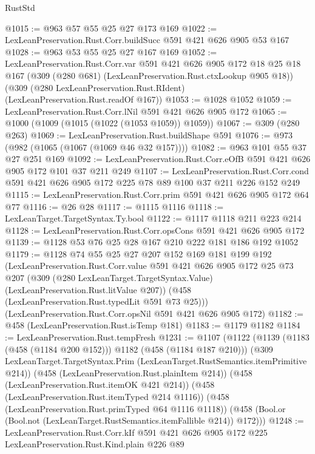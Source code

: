 \begin{lexlean}{RustStd}
\begin{coremodule}
@1015 := @963 @57 @55 @25 @27 @173 @169
@1022 := LexLeanPreservation.Rust.Corr.buildSucc @591 @421 @626 @905 @53 @167
@1028 := @963 @53 @55 @25 @27 @167 @169
@1052 := LexLeanPreservation.Rust.Corr.var
    @591
    @421
    @626
    @905
    @172
    @18
    @25
    @18
    @167
    (@309 (@280 @681) (LexLeanPreservation.Rust.ctxLookup @905 @18))
    (@309 (@280 LexLeanPreservation.Rust.RIdent) (LexLeanPreservation.Rust.readOf @167))
@1053 := @1028 @1052
@1059 := LexLeanPreservation.Rust.Corr.lNil @591 @421 @626 @905 @172
@1065 := @1000 (@1009 (@1015 (@1022 (@1053 @1059)) @1059))
@1067 := @309 (@280 @263)
@1069 := LexLeanPreservation.Rust.buildShape @591
@1076 := @973 (@982 (@1065 (@1067 (@1069 @46 @32 @157))))
@1082 := @963 @101 @55 @37 @27 @251 @169
@1092 := LexLeanPreservation.Rust.Corr.eOfB @591 @421 @626 @905 @172 @101 @37 @211 @249
@1107 := LexLeanPreservation.Rust.Corr.cond
    @591
    @421
    @626
    @905
    @172
    @225
    @78
    @89
    @100
    @37
    @211
    @226
    @152
    @249
@1115 := LexLeanPreservation.Rust.Corr.prim @591 @421 @626 @905 @172 @64 @77
@1116 := @26 @28
@1117 := @1115 @1116
@1118 := LexLeanTarget.TargetSyntax.Ty.bool
@1122 := @1117 @1118 @211 @223 @214
@1128 := LexLeanPreservation.Rust.Corr.opsCons @591 @421 @626 @905 @172
@1139 := @1128 @53 @76 @25 @28 @167 @210 @222 @181 @186 @192 @1052
@1179 := @1128
    @74
    @55
    @25
    @27
    @207
    @152
    @169
    @181
    @199
    @192
    (LexLeanPreservation.Rust.Corr.value
      @591
      @421
      @626
      @905
      @172
      @25
      @73
      @207
      (@309 (@280 LexLeanTarget.TargetSyntax.Value) (LexLeanPreservation.Rust.litValue @207))
      (@458 (LexLeanPreservation.Rust.typedLit @591 @73 @25)))
    (LexLeanPreservation.Rust.Corr.opsNil @591 @421 @626 @905 @172)
@1182 := @458 (LexLeanPreservation.Rust.isTemp @181)
@1183 := @1179 @1182
@1184 := LexLeanPreservation.Rust.tempFresh
@1231 := @1107
    (@1122
      (@1139 (@1183 (@458 (@1184 @200 @152))) @1182 (@458 (@1184 @187 @210)))
      (@309 LexLeanTarget.TargetSyntax.Prim (LexLeanTarget.RustSemantics.itemPrimitive @214))
      (@458 (LexLeanPreservation.Rust.plainItem @214))
      (@458 (LexLeanPreservation.Rust.itemOK @421 @214))
      (@458 (LexLeanPreservation.Rust.itemTyped @214 @1116))
      (@458 (LexLeanPreservation.Rust.primTyped @64 @1116 @1118))
      (@458 (Bool.or (Bool.not (LexLeanTarget.RustSemantics.itemFallible @214)) @172)))
@1248 := LexLeanPreservation.Rust.Corr.kIf
    @591
    @421
    @626
    @905
    @172
    @225
    LexLeanPreservation.Rust.Kind.plain
    @226
    @89

\end{coremodule}
\end{lexlean}
